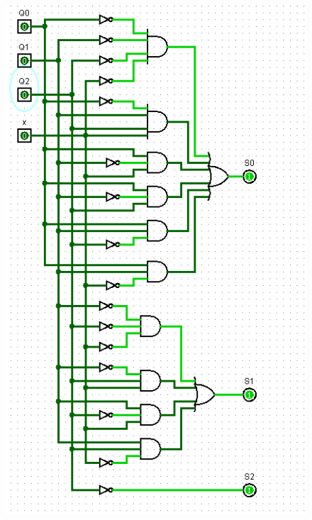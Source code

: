 \documentclass[]{article}
\begin{document}
\begin{minipage}{0.5\textwidth}
\begin{figure}[H]
	\centering
	\includegraphics[width=1\textwidth]{test0_0.png}
\end{figure}
\end{minipage}
\end{document}
